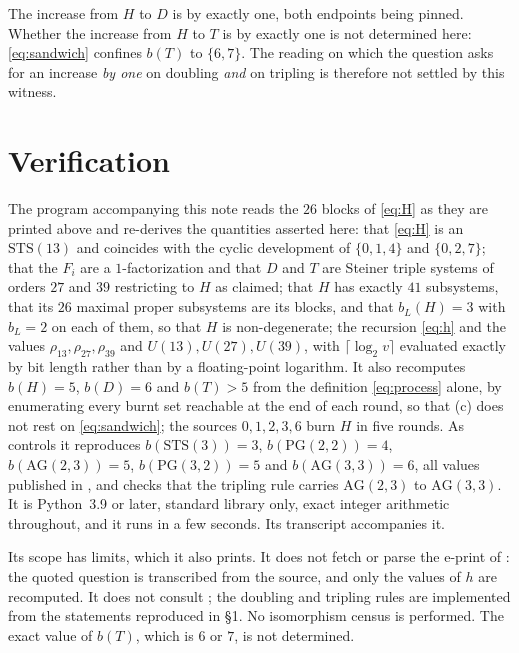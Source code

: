 \documentclass[11pt]{amsart}
\newcommand{\STS}{\mathrm{STS}}
\newcommand{\PG}{\mathrm{PG}}
\newcommand{\AG}{\mathrm{AG}}
\newcommand{\bL}{b_{L}}
\begin{document}
The increase from $H$ to $D$ is by exactly one, both endpoints being pinned.
Whether the increase from $H$ to $T$ is by exactly one is not determined here:
\eqref{eq:sandwich} confines $b(T)$ to $\{6,7\}$. The reading on which the
question asks for an increase \emph{by one} on doubling \emph{and} on tripling
is therefore not settled by this witness.

\section{Verification}

The program accompanying this note reads the $26$ blocks of \eqref{eq:H} as
they are printed above and re-derives the quantities asserted here: that
\eqref{eq:H} is an $\STS(13)$ and coincides with the cyclic development of
$\{0,1,4\}$ and $\{0,2,7\}$; that the $F_i$ are a $1$-factorization and that
$D$ and $T$ are Steiner triple systems of orders $27$ and $39$ restricting to
$H$ as claimed; that $H$ has exactly $41$ subsystems, that its $26$ maximal
proper subsystems are its blocks, and that $\bL(H)=3$ with $\bL=2$ on each of
them, so that $H$ is non-degenerate; the recursion \eqref{eq:h} and the values
$\rho_{13},\rho_{27},\rho_{39}$ and $U(13),U(27),U(39)$, with
$\lceil\log_2v\rceil$ evaluated exactly by bit length rather than by a
floating-point logarithm. It also recomputes $b(H)=5$, $b(D)=6$ and $b(T)>5$
from the definition \eqref{eq:process} alone, by enumerating every burnt set
reachable at the end of each round, so that (c) does not rest on
\eqref{eq:sandwich}; the sources $0,1,2,3,6$ burn $H$ in five rounds. As
controls it reproduces $b(\STS(3))=3$, $b(\PG(2,2))=4$, $b(\AG(2,3))=5$,
$b(\PG(3,2))=5$ and $b(\AG(3,3))=6$, all values published in \cite{BDJMP}, and
checks that the tripling rule carries $\AG(2,3)$ to $\AG(3,3)$. It is
Python~3.9 or later, standard library only, exact integer arithmetic
throughout, and it runs in a few seconds. Its transcript accompanies it.

Its scope has limits, which it also prints. It does not fetch or parse the
e-print of \cite{BDJMP}: the quoted question is transcribed from the source,
and only the values of $h$ are recomputed. It does not consult \cite{Handbook};
the doubling and tripling rules are implemented from the statements reproduced
in \S1. No isomorphism census is performed. The exact value of $b(T)$, which is
$6$ or $7$, is not determined.
\end{document}
